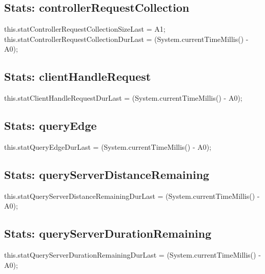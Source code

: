 \subsection{Stats: controllerRequestCollection}
\nwenddocs{}\endmoddef{}
this.statControllerRequestCollectionSizeLast = A1;
this.statControllerRequestCollectionDurLast = (System.currentTimeMillis() - A0);
\nwendcode{}\nwdocspar

\subsection{Stats: clientHandleRequest}
\nwenddocs{}\endmoddef{}
this.statClientHandleRequestDurLast = (System.currentTimeMillis() - A0);
\nwendcode{}\nwdocspar

\subsection{Stats: queryEdge}
\nwenddocs{}\endmoddef{}
this.statQueryEdgeDurLast = (System.currentTimeMillis() - A0);
\nwendcode{}\nwdocspar

\subsection{Stats: queryServerDistanceRemaining}
\nwenddocs{}\endmoddef{}
this.statQueryServerDistanceRemainingDurLast = (System.currentTimeMillis() - A0);
\nwendcode{}\nwdocspar

\subsection{Stats: queryServerDurationRemaining}
\nwenddocs{}\endmoddef{}
this.statQueryServerDurationRemainingDurLast = (System.currentTimeMillis() - A0);
\nwendcode{}\nwdocspar

